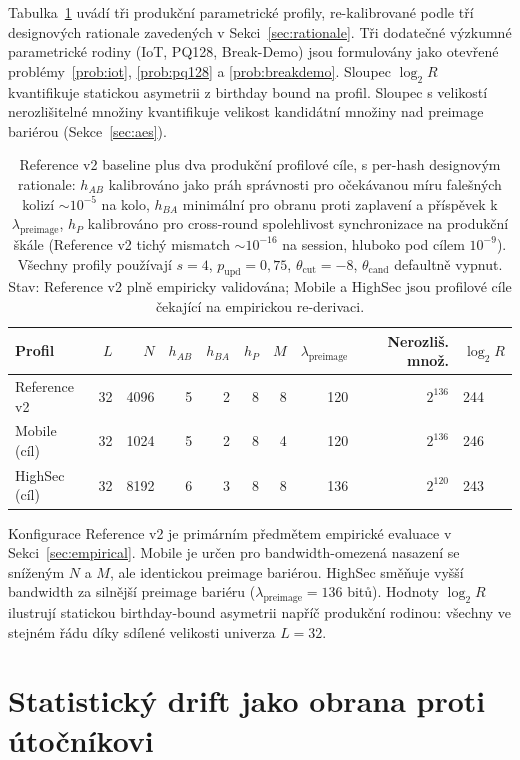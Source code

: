 \documentclass[11pt,a4paper]{article}
\begin{document}
Tabulka~\ref{tab:profiles} uvádí tři produkční parametrické profily, re-kalibrované podle tří designových rationale zavedených v Sekci~\ref{sec:rationale}. Tři dodatečné výzkumné parametrické rodiny (IoT, PQ128, Break-Demo) jsou formulovány jako otevřené problémy~\ref{prob:iot}, \ref{prob:pq128} a \ref{prob:breakdemo}. Sloupec $\log_2 R$ kvantifikuje statickou asymetrii z birthday bound na profil. Sloupec s velikostí nerozlišitelné množiny kvantifikuje velikost kandidátní množiny nad preimage bariérou (Sekce~\ref{sec:aes}).

\begin{table}[ht]
\centering
\small
\begin{tabular}{lrrrrrrrrl}
\toprule
Profil & $L$ & $N$ & $h_{AB}$ & $h_{BA}$ & $h_P$ & $M$ & $\lambda_\text{preimage}$ & Nerozliš. množ. & $\log_2 R$ \\
\midrule
Reference v2 & 32 & 4096 & 5 & 2 & 8 & 8 & 120 & $2^{136}$ & 244 \\
Mobile (cíl) & 32 & 1024 & 5 & 2 & 8 & 4 & 120 & $2^{136}$ & 246 \\
HighSec (cíl) & 32 & 8192 & 6 & 3 & 8 & 8 & 136 & $2^{120}$ & 243 \\
\bottomrule
\end{tabular}
\caption{Reference v2 baseline plus dva produkční profilové cíle, s per-hash designovým rationale: $h_{AB}$ kalibrováno jako práh správnosti pro očekávanou míru falešných kolizí $\sim 10^{-5}$ na kolo, $h_{BA}$ minimální pro obranu proti zaplavení a příspěvek k $\lambda_\text{preimage}$, $h_P$ kalibrováno pro cross-round spolehlivost synchronizace na produkční škále (Reference v2 tichý mismatch $\sim 10^{-16}$ na session, hluboko pod cílem $10^{-9}$). Všechny profily používají $s = 4$, $p_\text{upd} = 0{,}75$, $\theta_{\text{cut}} = -8$, $\theta_{\text{cand}}$ defaultně vypnut. Stav: Reference v2 plně empiricky validována; Mobile a HighSec jsou profilové cíle čekající na empirickou re-derivaci.}
\label{tab:profiles}
\end{table}

Konfigurace Reference v2 je primárním předmětem empirické evaluace v Sekci~\ref{sec:empirical}. Mobile je určen pro bandwidth-omezená nasazení se sníženým $N$ a $M$, ale identickou preimage bariérou. HighSec směňuje vyšší bandwidth za silnější preimage bariéru ($\lambda_\text{preimage} = 136$ bitů). Hodnoty $\log_2 R$ ilustrují statickou birthday-bound asymetrii napříč produkční rodinou: všechny ve stejném řádu díky sdílené velikosti univerza $L = 32$.

\section{Statistický drift jako obrana proti útočníkovi}\label{sec:drift}
\end{document}
